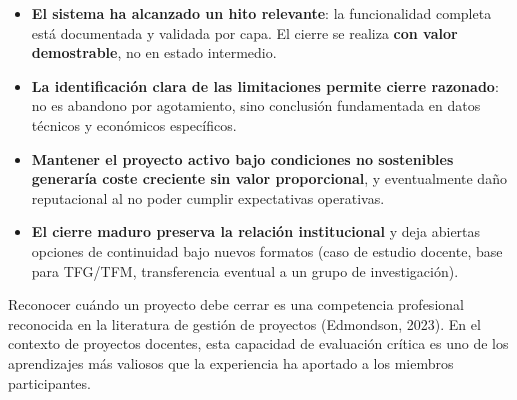 \begin{itemize}[leftmargin=*]
    \item \textbf{El sistema ha alcanzado un hito relevante}: la
    funcionalidad completa est\'a documentada y validada por capa.
    El cierre se realiza \textbf{con valor demostrable}, no en estado
    intermedio.

    \item \textbf{La identificaci\'on clara de las limitaciones permite
    cierre razonado}: no es abandono por agotamiento, sino conclusi\'on
    fundamentada en datos t\'ecnicos y econ\'omicos espec\'ificos.

    \item \textbf{Mantener el proyecto activo bajo condiciones no
    sostenibles generar\'ia coste creciente sin valor proporcional},
    y eventualmente da\~no reputacional al no poder cumplir
    expectativas operativas.

    \item \textbf{El cierre maduro preserva la relaci\'on institucional}
    y deja abiertas opciones de continuidad bajo nuevos formatos
    (caso de estudio docente, base para TFG/TFM, transferencia
    eventual a un grupo de investigaci\'on).
\end{itemize}

\begin{warningbox}
Reconocer cu\'ando un proyecto debe cerrar es una competencia
profesional reconocida en la literatura de gesti\'on de proyectos
(Edmondson, 2023). En el contexto de proyectos docentes, esta
capacidad de evaluaci\'on cr\'itica es uno de los aprendizajes m\'as
valiosos que la experiencia ha aportado a los miembros participantes.
\end{warningbox}
